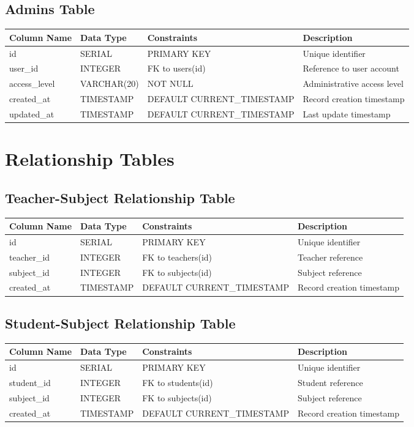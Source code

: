 \documentclass[11pt,a4paper]{article}
\begin{document}
\subsection{Admins Table}
\begin{longtable}{|p{3.5cm}|p{2.5cm}|p{3cm}|p{5.5cm}|}
\hline
\textbf{Column Name} & \textbf{Data Type} & \textbf{Constraints} & \textbf{Description} \\
\hline
\endhead
id & SERIAL & PRIMARY KEY & Unique identifier \\
\hline
user\_id & INTEGER & FK to users(id) & Reference to user account \\
\hline
access\_level & VARCHAR(20) & NOT NULL & Administrative access level \\
\hline
created\_at & TIMESTAMP & DEFAULT CURRENT\_TIMESTAMP & Record creation timestamp \\
\hline
updated\_at & TIMESTAMP & DEFAULT CURRENT\_TIMESTAMP & Last update timestamp \\
\hline
\end{longtable}

\section{Relationship Tables}

\subsection{Teacher-Subject Relationship Table}
\begin{longtable}{|p{3.5cm}|p{2.5cm}|p{3cm}|p{5.5cm}|}
\hline
\textbf{Column Name} & \textbf{Data Type} & \textbf{Constraints} & \textbf{Description} \\
\hline
\endhead
id & SERIAL & PRIMARY KEY & Unique identifier \\
\hline
teacher\_id & INTEGER & FK to teachers(id) & Teacher reference \\
\hline
subject\_id & INTEGER & FK to subjects(id) & Subject reference \\
\hline
created\_at & TIMESTAMP & DEFAULT CURRENT\_TIMESTAMP & Record creation timestamp \\
\hline
\end{longtable}

\subsection{Student-Subject Relationship Table}
\begin{longtable}{|p{3.5cm}|p{2.5cm}|p{3cm}|p{5.5cm}|}
\hline
\textbf{Column Name} & \textbf{Data Type} & \textbf{Constraints} & \textbf{Description} \\
\hline
\endhead
id & SERIAL & PRIMARY KEY & Unique identifier \\
\hline
student\_id & INTEGER & FK to students(id) & Student reference \\
\hline
subject\_id & INTEGER & FK to subjects(id) & Subject reference \\
\hline
created\_at & TIMESTAMP & DEFAULT CURRENT\_TIMESTAMP & Record creation timestamp \\
\hline
\end{longtable}
\end{document}
